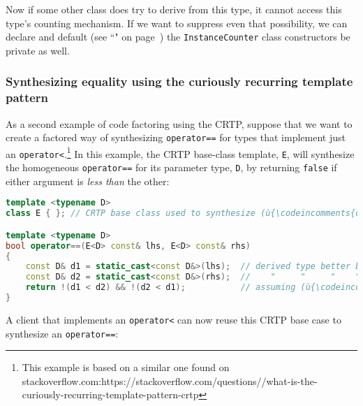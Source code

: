 \noindent Now if some other class does try to derive from this type, it cannot
access this type's counting mechanism. If we want to suppress even that
possibility, we can declare and default (see ``" on page~\pageref{defaulted-special-member-functions}) the \texttt{InstanceCounter}
class constructors be private as well.

\subsubsection[Synthesizing equality using the curiously recurring template pattern]{Synthesizing equality using the curiously recurring template pattern}\label{synthesizing-equality-using-crtp}

As a second example of code factoring using the CRTP, suppose that we want
to create a factored way of synthesizing \texttt{operator==} for types
that implement just an \texttt{operator<}.{\cprotect\footnote{This
example is based on a similar one found on stackoverflow.com:\linebreak[3]
  https://\linebreak[3]stackoverflow.\linebreak[3]com/\linebreak[3]questions//what-is-the-curiously-recurring-template-pattern-crtp}}
In this example, the CRTP base-class template, \texttt{E}, will
synthesize the homogeneous \texttt{operator==} for its parameter type,
\texttt{D}, by returning \texttt{false} if either argument is \emph{less
than} the other:

\begin{lstlisting}[language=C++]
template <typename D>
class E { }; // CRTP base class used to synthesize (ù{\codeincomments{operator==}}ù) for (ù{\codeincomments{D}}ù)

template <typename D>
bool operator==(E<D> const& lhs, E<D> const& rhs)
{
    const D& d1 = static_cast<const D&>(lhs);  // derived type better be (ù{\codeincomments{D}}ù)
    const D& d2 = static_cast<const D&>(rhs);  //    "     "     "    "  "
    return !(d1 < d2) && !(d2 < d1);           // assuming (ù{\codeincomments{D}}ù) has an (ù{\codeincomments{operator<}}ù)
}
\end{lstlisting}
    
\noindent A client that implements an \texttt{operator<} can now reuse this CRTP
base case to synthesize an \texttt{operator==}:

